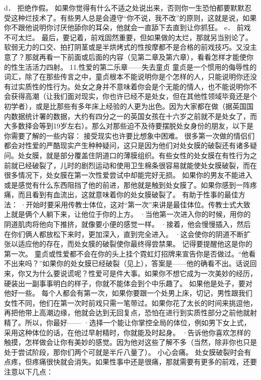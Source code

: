 \documentclass[12pt,UTF8]{ctexbook}
\begin{document}
d． 拒绝作假。
如果你觉得有什么不适之处说出来，否则你一生恐怕都要默默忍受这种烂技术了。有些男人总是会遵守“你不说，我不改”的原则，这就是说，如果你不跟他说明你讨厌他舔你的耳朵，他就会一直舔下去直到让你抓狂。
e． 前戏不可太烂。
最后，要记着，前戏固然重要，但如果做的太烂，那就另当别论了。软弱无力的口交、拍打阴茎或是半烘烤式的性按摩都不是合格的前戏技巧。又没主意了？那就再看一下前面或后面的内容（见第二章及第六章），看看怎样才能使你的性生活活力四射。
11.性爱的第二乐章——失去童贞
童贞是一个惯用的侮辱性的词汇，除了在那些传言之中，童贞根本不能说明你是个怎样的人，只能说明你还没有过实质性的性行为。处女之身并不意味着你会是个无能的情人，也不能说明你不会获得高潮（让我们面对现实，你也许已经不是处女，但在其他性领域毕竟还是个初学者），或是比那些有多年床上经验的人更为出色。因为大家都在做（据英国国内数据统计署的数据，大约有四分之一的英国女孩在十六岁之前就不是处女了，而大多数择会等到19岁左右）。那么对那些迫不及待要摆脱处女身份的朋友，以下是你需要了解的一些内容：
接受现实也许要比想象中困难。
很多第一次做的情侣们都会对性爱的严酷现实产生种种疑问，这只是因为他们对处女膜的破裂还有诸多疑问。处女膜，就是部分覆盖住阴道口的薄膜组织。有些女性的处女膜在有性行为之前就已经破裂了，儿时的剧烈运动和使用卫生棉条很容易就能使处女膜破裂，而在很多情况下，处女膜在第一次性爱尝试中却能完好无损。
如果你的男友不能进入或是感觉有什么东西阻挡了他的前进，那他就是触到处女膜了。如果你感到一阵疼痛，而且看到有血流出，这就意味着你的处女膜破裂了。
有助于性事的最佳方法：
·开始时要采用传教士体位，这对“第一次”来讲是最佳体位。传教士式大致上就是俩个人躺下来，让他位于你的上方。
·当他第一次进入你的时候，用你的阴道肌肉将他向下推挤，就像要小便的感觉一样。
·接着，他会慢慢插入，然后在你们俩人都放松下来时，更加深入，直到完全进入。
·这会使你的阴道不断扩张以适应他的存在，而处女膜的破裂使你最终得尝禁果。
记得要提醒他这是你的第一次。
童贞或性爱都不会在你的头上挂个霓虹灯招牌来宣告你是否做过。“他看不出来吗？”如果你的处女膜已经破裂（见上），答案是——他的确看不出。话说回来，你又为什么要说谎呢？性爱可是件大事。如果你不想它成为一次美妙的经历，硬装出一副事事明白的样子，你就不能体会到个中乐趣了。
如果他是处子，要对他好一些。
每个人都会有第一次，如果你要跟一个处男上床，切记，男性跟我们女性不同，他们在第一次时前戏只需一笔带过。如果你花了太长的时间来挑逗他，再把他带上高潮边缘，他就会达到无回复点，恐怕在进行到实质性部分之前他就射精了。所以，你最好——
·选择一个能让你掌控全局的体位，例如男下女上式，采用这种体位的话，在他过早射精时，你就能及时起身。
·告诉他你喜欢怎样的触摸，怎样做会让你有美妙的感觉。因为他对这些了解不多（当然，除非你也只是处于尝试阶段，那你们两个可就是半斤八量了）。
小心会痛。
处女膜破裂时会有点疼，但疼痛很快就会消失。如果性事中还是很痛，那就需要有更多的前戏，还要注意以下几点：
\end{document}
